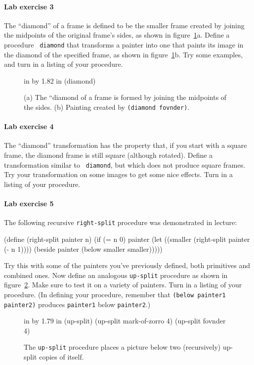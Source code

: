 \paragraph{Lab exercise 3}
The ``diamond'' of a frame is defined to be the smaller frame
created by joining the midpoints of the original frame's sides, as shown in
figure~\ref{diamond}a.  Define a procedure {\tt
diamond} that transforms a painter into one that paints its image in
the diamond of the specified frame, as shown in
figure~\ref{diamond}b.  Try some examples, and turn in a listing of
your procedure.

\begin{figure}
 in by 1.82 in (diamond)
\caption{{\protect\footnotesize
(a) The ``diamond of a frame is formed by joining the midpoints
of the sides.  (b) Painting created by {\tt (diamond fovnder)}.}}
\label{diamond}
\end{figure}

\paragraph{Lab exercise 4}

The ``diamond'' transformation has the property that, if you start
with a square frame, the diamond frame is still square
(although rotated).  Define a transformation similar to {\tt
diamond}, but which does not produce square frames.  Try your
transformation on some images to get some nice effects.  Turn in a
listing of your procedure.

\paragraph{Lab exercise 5}
The following recursive {\tt right-split} procedure was demonstrated
in lecture:

\beginlisp
(define (right-split painter n)
  (if (= n 0)
      painter
      (let ((smaller (right-split painter (- n 1))))
        (beside painter (below smaller smaller)))))
\endlisp

Try this with some of the painters you've previously defined, both
primitives and combined ones.  Now define an analogous {\tt up-split}
procedure as shown in figure~\ref{up-split}.  Make sure to test it on
a variety of painters.  Turn in a listing of your procedure.  (In
defining your procedure, remember that {\tt (below painter1
painter2)} produces {\tt painter1} below {\tt painter2}.)

\begin{figure}
 in by 1.79 in (up-split)
\beginlisp
                  (up-split mark-of-zorro 4)      (up-split fovnder 4)
\endlisp
\caption{{\protect\footnotesize
The {\tt up-split} procedure places a picture below two (recursively)
up-split copies of itself.}}
\label{up-split}
\end{figure}


